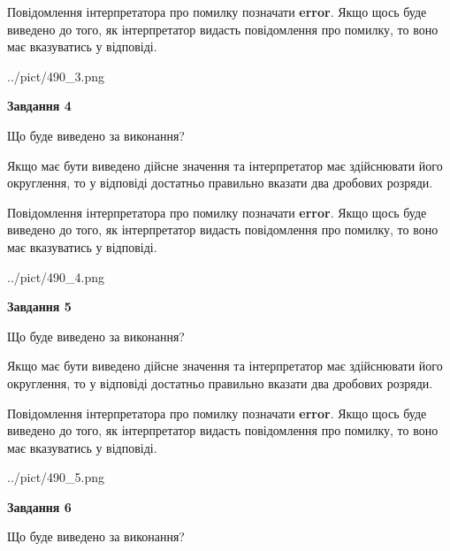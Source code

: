 \documentclass[12pt, ukrainian]{article}
\begin{document}
{\begin {Large}
Повідомлення інтерпретатора про помилку позначати \textbf{error}.
Якщо щось буде виведено до того, як інтерпретатор видасть повідомлення про помилку, 
то воно має вказуватись у відповіді. \par

\begin{center}
	{../pict/490_3.png}
\end{center}
\newpage

{\begin {center}\textbf{Завдання 4}\end {center}}\par
Що буде виведено за виконання? \par

Якщо має бути виведено дійсне значення та інтерпретатор має здійснювати його округлення, 
то у відповіді достатньо правильно вказати два дробових розряди.

Повідомлення інтерпретатора про помилку позначати \textbf{error}.
Якщо щось буде виведено до того, як інтерпретатор видасть повідомлення про помилку, 
то воно має вказуватись у відповіді. \par

\begin{center}
	{../pict/490_4.png}
\end{center}
\newpage

{\begin {center}\textbf{Завдання 5}\end {center}}\par
Що буде виведено за виконання? \par

Якщо має бути виведено дійсне значення та інтерпретатор має здійснювати його округлення, 
то у відповіді достатньо правильно вказати два дробових розряди.

Повідомлення інтерпретатора про помилку позначати \textbf{error}.
Якщо щось буде виведено до того, як інтерпретатор видасть повідомлення про помилку, 
то воно має вказуватись у відповіді. \par

\begin{center}
	{../pict/490_5.png}
\end{center}
\newpage

{\begin {center}\textbf{Завдання 6}\end {center}}\par
Що буде виведено за виконання? \par


\end{Large}}
\end{document}

